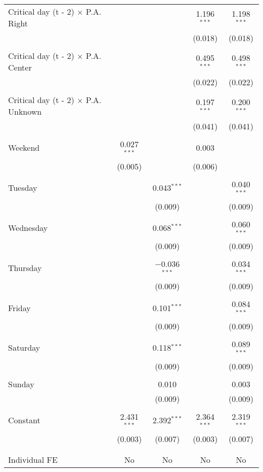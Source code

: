 \documentclass[
]{article}
\begin{document}
\begin{table}[!htbp]
{\begin{tabular}{@{\extracolsep{5pt}}lcccc}
 Critical day (t - 2) $\times$ P.A. Right &  &  & 1.196$^{***}$ & 1.198$^{***}$ \\ 
  &  &  & (0.018) & (0.018) \\ 
  & & & & \\ 
 Critical day (t - 2) $\times$ P.A. Center &  &  & 0.495$^{***}$ & 0.498$^{***}$ \\ 
  &  &  & (0.022) & (0.022) \\ 
  & & & & \\ 
 Critical day (t - 2) $\times$ P.A. Unknown &  &  & 0.197$^{***}$ & 0.200$^{***}$ \\ 
  &  &  & (0.041) & (0.041) \\ 
  & & & & \\ 
 Weekend & 0.027$^{***}$ &  & 0.003 &  \\ 
  & (0.005) &  & (0.006) &  \\ 
  & & & & \\ 
 Tuesday &  & 0.043$^{***}$ &  & 0.040$^{***}$ \\ 
  &  & (0.009) &  & (0.009) \\ 
  & & & & \\ 
 Wednesday &  & 0.068$^{***}$ &  & 0.060$^{***}$ \\ 
  &  & (0.009) &  & (0.009) \\ 
  & & & & \\ 
 Thursday &  & $-$0.036$^{***}$ &  & 0.034$^{***}$ \\ 
  &  & (0.009) &  & (0.009) \\ 
  & & & & \\ 
 Friday &  & 0.101$^{***}$ &  & 0.084$^{***}$ \\ 
  &  & (0.009) &  & (0.009) \\ 
  & & & & \\ 
 Saturday &  & 0.118$^{***}$ &  & 0.089$^{***}$ \\ 
  &  & (0.009) &  & (0.009) \\ 
  & & & & \\ 
 Sunday &  & 0.010 &  & 0.003 \\ 
  &  & (0.009) &  & (0.009) \\ 
  & & & & \\ 
 Constant & 2.431$^{***}$ & 2.392$^{***}$ & 2.364$^{***}$ & 2.319$^{***}$ \\ 
  & (0.003) & (0.007) & (0.003) & (0.007) \\ 
  & & & & \\ 
\hline \\[-1.8ex] 
Individual FE & No & No & No & No \\ 

\end{tabular}}
\end{table}
\end{document}
